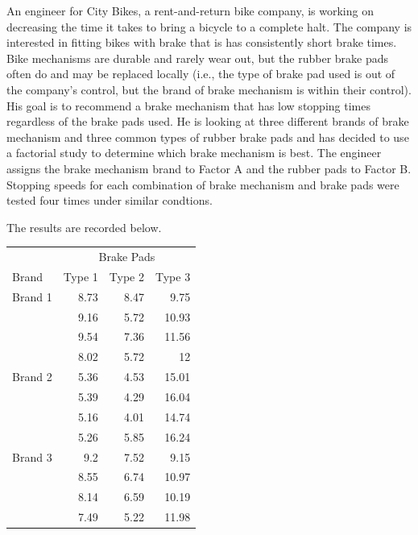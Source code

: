 \documentclass[addpoints]{examsetup}\usepackage[]{graphicx}\usepackage[]{color}
\begin{document}



\examCoverPage

\begin{questions}

\question

An engineer for City Bikes, a rent-and-return bike company, is working on decreasing the time it takes to bring a bicycle to a complete halt.
The company is interested in fitting bikes with brake that is has consistently short brake times. 
Bike mechanisms are durable and rarely wear out, but the rubber brake pads often do and may be replaced locally (i.e., the type of brake pad used is out of the company's control, but the brand of brake mechanism is within their control).
His goal is to recommend a brake mechanism that has low stopping times regardless of the brake pads used.
He is looking at three different brands of brake mechanism and three common types of rubber brake pads and has decided to use a factorial study to determine which brake mechanism is best.
The engineer assigns the brake mechanism brand to Factor A and the rubber pads to Factor B. 
Stopping speeds for each combination of brake mechanism and brake pads were tested four times under similar condtions.

The results are recorded below.



\begin{table}[h]
\centering
\begin{tabular}{lrrr}
   & \multicolumn{3}{c}{Brake Pads} \\
\cline{2-4}
Brand & Type 1 & Type 2 & Type 3\\ \hline \hline
Brand 1 & 8.73 & 8.47 & 9.75 \\
        & 9.16 & 5.72 & 10.93 \\
        & 9.54 & 7.36 & 11.56 \\
        & 8.02 & 5.72 & 12 \\
Brand 2 & 5.36 & 4.53 & 15.01 \\
        & 5.39 & 4.29 & 16.04 \\
        & 5.16 & 4.01 & 14.74 \\
        & 5.26 & 5.85 & 16.24 \\
Brand 3 & 9.2 & 7.52 & 9.15 \\
        & 8.55 & 6.74 & 10.97 \\
        & 8.14 & 6.59 & 10.19 \\
        & 7.49 & 5.22 & 11.98 \\
\hline
\end{tabular}
\end{table}


\end{questions}
\end{document}
